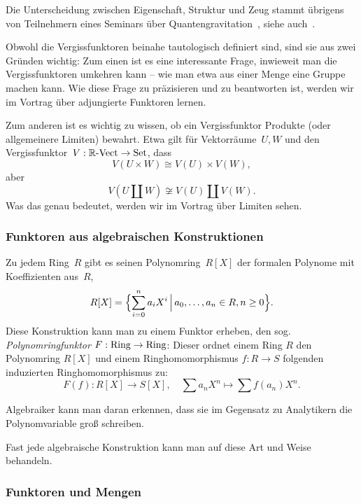 Die Unterscheidung zwischen Eigenschaft, Struktur und Zeug stammt übrigens
von Teilnehmern eines Seminars über
Quantengravitation~\cite[Abschn.~2.4]{lectures-on-n-categories}, siehe
auch~\cite{ncatlab:stuff}.

Obwohl die Vergissfunktoren beinahe tautologisch definiert sind, sind sie aus
zwei Gründen wichtig: Zum einen ist es eine interessante Frage, inwieweit
man die Vergissfunktoren umkehren kann -- wie man etwa aus einer Menge eine
Gruppe machen kann. Wie diese Frage zu präzisieren und zu beantworten ist,
werden wir im Vortrag über adjungierte Funktoren lernen.

Zum anderen ist es wichtig zu wissen, ob ein Vergissfunktor Produkte (oder
allgemeinere Limiten) bewahrt. Etwa gilt für Vektorräume~$U, W$ und den
Vergissfunktor~$V:{\mathbb{R}\text{-}\mathrm{Vect}} \to \mathrm{Set}$, dass
\[ V(U \times W) \cong V(U) \times V(W), \]
aber
\[ V(U \amalg W) \not\cong V(U) \amalg V(W). \]
Was das genau bedeutet, werden wir im Vortrag über Limiten sehen.


\subsubsection{Funktoren aus algebraischen Konstruktionen}

Zu jedem Ring~$R$ gibt es seinen Polynomring~$R[X]$ der formalen Polynome mit
Koeffizienten aus~$R$,
\[ R[X] = \Bigl\{ \sum_{i=0}^n a_i X^i \,\Big|\, a_0,\ldots,a_n \in R, n \geq 0
\Bigr\}. \]
Diese Konstruktion kann man zu einem Funktor erheben, den sog.
\emph{Polynomringfunktor} $F : \mathrm{Ring} \to \mathrm{Ring}$: Dieser ordnet einem Ring $R$
den Polynomring $R[X]$ und einem Ringhomomorphismus $f : R \to S$ folgenden
induzierten Ringhomomorphismus zu:
\[ F(f) : R[X] \to S[X], \quad \sum a_n X^n \mapsto \sum f(a_n) X^n. \]

\begin{bem}Algebraiker kann man daran erkennen, dass sie im Gegensatz zu
Analytikern die Polynomvariable groß schreiben.\end{bem}

Fast jede algebraische Konstruktion kann man auf diese Art und Weise behandeln.


\subsubsection{Funktoren und Mengen}


